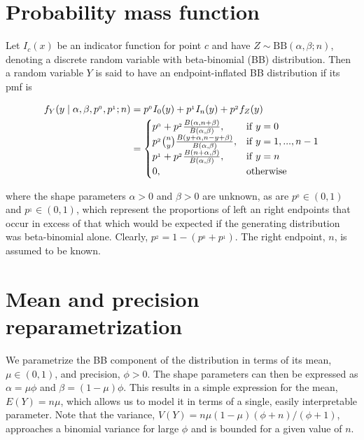 \section{Probability mass function}
\label{sec:pmf}

Let $I_c(x)$ be an indicator function for point $c$ and have $Z \sim \mathrm{BB}(\alpha, \beta; n)$, denoting a discrete random variable with beta-binomial (BB) distribution. Then a random variable $Y$ is said to have an endpoint-inflated BB distribution if its pmf is

\begin{equation}
\begin{split}
f_{Y}(y \mid \alpha , \beta , p^{_0}, p^{_1}; n)
&= p^{_0}I_0(y) + p^{_1}I_n(y) + p^{_2} f_{Z}(y)\\
&=	\begin{cases}
p^{_0} + p^{_2} {B(\alpha, n+\beta) \over B(\alpha,\beta)}, & \mathrm{if}\; y=0\\
p^{_2} {n \choose y} {B(y+\alpha, n-y+\beta) \over B(\alpha,\beta)}, & \mathrm{if}\; y=1,...,n-1\\
p^{_1} + p^{_2} {B(n+\alpha, \beta) \over B(\alpha,\beta)}, & \mathrm{if}\; y=n\\
0, & \mathrm{otherwise}
	\end{cases}
\end{split}
\label{densidad}
\end{equation}
	
\noindent where the shape parameters $\alpha > 0$ and $\beta > 0$ are unknown, as are $p^{_0} \in (0, 1)$ and $p^{_1} \in (0, 1)$, which represent the proportions of left an right endpoints that occur in excess of that which would be expected if the generating distribution was beta-binomial alone. Clearly, $p^{_2} = 1 -  (p^{_0}+p^{_1})$.  The right endpoint, $n$, is assumed to be known.\\

\section{Mean and precision reparametrization}
\label{sec:reparam}

We parametrize the BB component of the distribution in terms of its mean, $\mu \in (0,1)$, and precision, $\phi > 0$. The shape parameters can then be expressed as $\alpha = \mu\phi$ and $\beta = (1-\mu)\phi$. This results in a simple expression for the mean, $E(Y) = n\mu$, which allows us to model it in terms of a single, easily interpretable parameter. Note that the variance, $V(Y) = n\mu(1-\mu)(\phi+n)/(\phi+1)$, approaches a binomial variance for large $\phi$ and is bounded for a given value of $n$.\\

